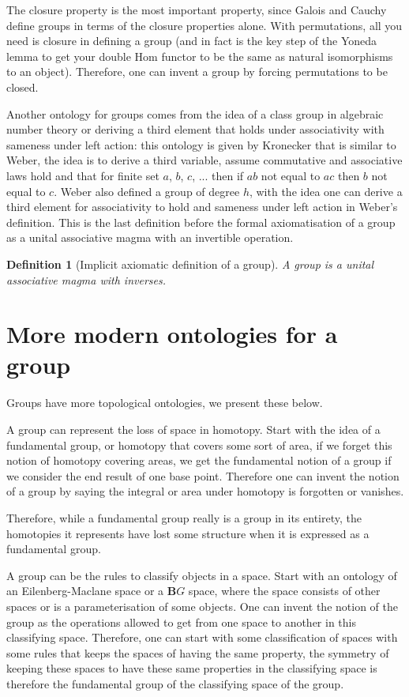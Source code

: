 \documentclass{tufte-book}
\newtheorem{definition}[theorem]{Definition}
\begin{document}
The closure property is the most important property, since Galois and Cauchy define groups in terms of the closure properties alone. With permutations, all you need is closure in defining a group (and in fact is the key step of the Yoneda lemma to get your double Hom functor to be the same as natural isomorphisms to an object). Therefore, one can invent a group by forcing permutations to be closed.

Another ontology for groups comes from the idea of a class group in algebraic number theory or deriving a third element that holds under associativity with sameness under left action: this ontology is given by Kronecker that is similar to Weber, the idea is to derive a third variable, assume commutative and associative laws hold and that for finite set $a$, $b$, $c$, ... then if $ab$ not equal to $ac$ then $b$ not equal to $c$. Weber also defined a group of degree $h$, with the idea one can derive a third element for associativity to hold and sameness under left action in Weber's definition. This is the last definition before the formal axiomatisation of a group as a unital associative magma with an invertible operation.

\begin{definition}[Implicit axiomatic definition of a group]
  A group is a unital associative magma with inverses.
\end{definition}

\section{More modern ontologies for a group}

Groups have more topological ontologies, we present these below.

A group can represent the loss of space in homotopy. Start with the idea of a fundamental group, or homotopy that covers some sort of area, if we forget this notion of homotopy covering areas, we get the fundamental notion of a group if we consider the end result of one base point. Therefore one can invent the notion of a group by saying the integral or area under homotopy is forgotten or vanishes.

Therefore, while a fundamental group really is a group in its entirety, the homotopies it represents have lost some structure when it is expressed as a fundamental group.

A group can be the rules to classify objects in a space. Start with an ontology of an Eilenberg-Maclane space or a $\mathbf{B}G$ space, where the space consists of other spaces or is a parameterisation of some objects. One can invent the notion of the group as the operations allowed to get from one space to another in this classifying space. Therefore, one can start with some classification of spaces with some rules that keeps the spaces of having the same property, the symmetry of keeping these spaces to have these same properties in the classifying space is therefore the fundamental group of the classifying space of the group.
\end{document}
